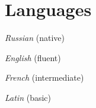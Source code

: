 \documentclass[11pt,letterpaper]{report}
\newcommand{\listitemspace}{0.25em}
\renewenvironment{itemize}
{\begin{list}{}{\setlength{\leftmargin}{0em}
                \setlength{\parskip}{0em}
                \setlength{\itemsep}{\listitemspace}
                \setlength{\parsep}{\listitemspace}}}
{\end{list}}
\begin{document}
    
    
    
    
     \section*{Languages}

    \begin{itemize}

       \item[] {\it Russian} (native)
       \item[] {\it English} (fluent)
       \item[] {\it French} (intermediate)
       \item[] {\it Latin} (basic)

    \end{itemize}

  

      
\end{document}
